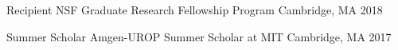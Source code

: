 


\begin{cvhonors}

  \cvhonor
    {Recipient} %
    {NSF Graduate Research Fellowship Program} %
    {Cambridge, MA} %
    {2018} %

  \cvhonor
    {Summer Scholar} %
    {Amgen-UROP Summer Scholar at MIT} %
    {Cambridge, MA} %
    {2017} %

\end{cvhonors}
